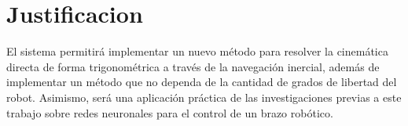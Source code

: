 \newpage
\section{Justificacion}

El sistema permitirá implementar un nuevo método para resolver la cinemática directa de forma trigonométrica a través de la navegación inercial, además de implementar un método que no dependa de la cantidad de grados de libertad del robot. Asimismo, será una aplicación práctica de las investigaciones previas a este trabajo sobre redes neuronales para el control de un brazo robótico.
